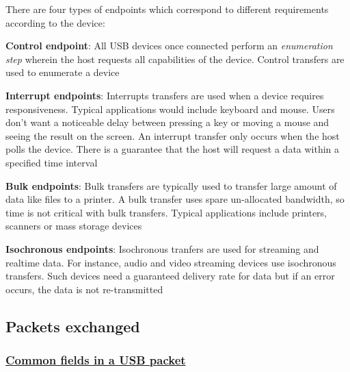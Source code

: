 \documentclass[pdftex,10pt,a4paper]{report}
\newenvironment{packed_item}{
\begin{itemize}
  \setlength{\itemsep}{1pt}
  \setlength{\parskip}{0pt}
  \setlength{\parsep}{0pt}
}{\end{itemize}}
\begin{document}
There are four types of endpoints which correspond to different requirements according to the device: 
\begin{packed_item}
	\item \textbf{Control endpoint}: All USB devices once connected perform an \textit{enumeration step} wherein the host requests all capabilities of the device. Control transfers are used to enumerate a device
	\item \textbf{Interrupt endpoints}: Interrupts transfers are used when a device requires responsiveness. Typical applications would include keyboard and mouse. Users don't want a noticeable delay between pressing a key or moving a mouse and seeing the result on the screen. An interrupt transfer only occurs when the host polls the device. There is a guarantee that the host will request a data within a specified time interval
	\item \textbf{Bulk endpoints}: Bulk transfers are typically used to transfer large amount of data like files to a printer. A bulk transfer uses spare un-allocated bandwidth, so time is not critical with bulk transfers. Typical applications include printers, scanners or mass storage devices
	\item \textbf{Isochronous endpoints}: Isochronous tranfers are used for streaming and realtime data. For instance, audio and video streaming devices use isochronous transfers. Such devices need a guaranteed delivery rate for data but if an error occurs, the data is not re-transmitted
\end{packed_item}
	

\subsection{Packets exchanged}
\subsubsection{\underline{Common fields in a USB packet}}
\end{document}
